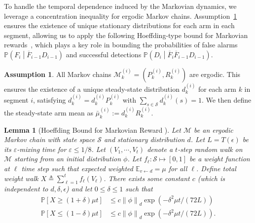 \documentclass[twoside]{article}
\theoremstyle{plain}
\newtheorem{lemma}[theorem]{Lemma}
\theoremstyle{definition}
\newtheorem{assumption}[theorem]{Assumption}
\theoremstyle{remark}
\begin{document}
To handle the temporal dependence induced by the Markovian dynamics, we leverage a concentration inequality for ergodic Markov chains.
Assumption~\ref{appassump:ergodic} ensures the existence of unique stationary distributions for each arm in each segment, allowing us to apply the following Hoeffding-type bound for Markovian rewards~\cite{Hoeffding_bound_Markovian_reward}, which plays a key role in bounding the probabilities of false alarms $\mathbb{P}\left(F_{i}\middle|\overline{F}_{i-1}D_{i-1}\right)$ and successful detections $\mathbb{P}\left(D_{i}\middle|\overline{F}_{i}\overline{F}_{i-1}D_{i-1}\right)$.

\begin{assumption}\label{appassump:ergodic}
All Markov chains $\mathcal{M}_k^{(i)} = (P_k^{(i)},R_k^{(i)})$ are ergodic. 
This ensures the existence of a unique steady-state distribution $d_k^{(i)}$ for 
each arm $k$ in segment $i$, satisfying 
$d_k^{(i)} = d_k^{(i)} P_k^{(i)}$ with $\sum_{s \in \mathcal{S}} d_k^{(i)}(s) = 1$. 
We then define the steady-state arm mean as 
$\bar{\mu}_k^{(i)} := d_k^{(i)} R_k^{(i)}$.
\end{assumption}

\begin{lemma}[Hoeffding Bound for Markovian Reward \cite{Hoeffding_bound_Markovian_reward}]
    \label{applem:Hoeffding bound for Markov Chain}
    Let $\mathcal{M}$ be an ergodic Markov chain with state space $\mathcal{S}$ and stationary distribution $d$. Let $L=T(\epsilon)$ be its $\varepsilon$-mixing time for $\varepsilon \leq 1/8$. Let $(V_1, \cdots, V_t)$ denote a $t$-step random walk on $\mathcal{M}$ starting from an initial distribution $\phi$. Let $f_\ell: \mathcal{S} \mapsto [0,1]$ be a weight function at $\ell$ time step such that expected weighted $\mathbb{E}_{v\leftarrow d}=\mu$ for all $\ell$. Define total weight walk $X\triangleq \sum^{t}_{\ell=1} f_\ell(V_\ell)$. There exists some constant $c$ (which is independent to $d, \delta, \epsilon$) and let $0\leq \delta\leq 1$ such that
    \begin{equation}
        \begin{aligned}
            \mathbb{P}[X\geq\left(1+\delta\right)\mu t]&\leq c {\lVert\phi\rVert}_{d} \exp{\left(-\delta^2\mu t/ \left(72L\right)\right)}\\
            \mathbb{P}[X\leq\left(1-\delta\right)\mu t]&\leq c {\lVert\phi\rVert}_{d} \exp{\left(-\delta^2\mu t/ \left(72L\right)\right)}.
        \end{aligned}
    \end{equation}
\end{lemma}
\end{document}
